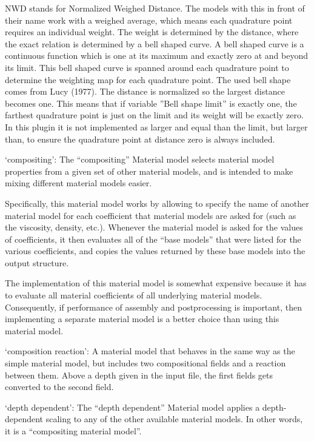 \begin{itemize}
NWD stands for Normalized Weighed Distance. The models with this in front of their name work with a weighed average, which means each quadrature point requires an individual weight. The weight is determined by the distance, where the exact relation is determined by a bell shaped curve. A bell shaped curve is a continuous function which is one at its maximum and exactly zero at and beyond its limit. This bell shaped curve is spanned around each quadrature point to determine the weighting map for each quadrature point. The used bell shape comes from Lucy (1977). The distance is normalized so the largest distance becomes one. This means that if variable ''Bell shape limit'' is exactly one, the farthest quadrature point is just on the limit and its weight will be exactly zero. In this plugin it is not implemented as larger and equal than the limit, but larger than, to ensure the quadrature point at distance zero is always included.

`compositing': The ``compositing'' Material model selects material model properties from a given set of other material models, and is intended to make mixing different material models easier.

Specifically, this material model works by allowing to specify the name of another material model for each coefficient that material models are asked for (such as the viscosity, density, etc.). Whenever the material model is asked for the values of coefficients, it then evaluates all of the ``base models'' that were listed for the various coefficients, and copies the values returned by these base models into the output structure.

The implementation of this material model is somewhat expensive because it has to evaluate all material coefficients of all underlying material models. Consequently, if performance of assembly and postprocessing is important, then implementing a separate material model is a better choice than using this material model.

`composition reaction': A material model that behaves in the same way as the simple material model, but includes two compositional fields and a reaction between them. Above a depth given in the input file, the first fields gets converted to the second field. 

`depth dependent': The ``depth dependent'' Material model applies a depth-dependent scaling to any of the other available material models. In other words, it is a ``compositing material model''.


\end{itemize}
